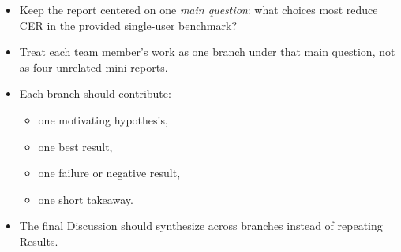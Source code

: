 \documentclass{article}
\begin{document}
\begin{itemize}[leftmargin=1.2em]
    \item Keep the report centered on one \emph{main question}: what choices most reduce CER in the provided single-user benchmark?
    \item Treat each team member's work as one branch under that main question, not as four unrelated mini-reports.
    \item Each branch should contribute:
    \begin{itemize}[leftmargin=1.2em]
        \item one motivating hypothesis,
        \item one best result,
        \item one failure or negative result,
        \item one short takeaway.
    \end{itemize}
    \item The final Discussion should synthesize across branches instead of repeating Results.
\end{itemize}



\end{document}
